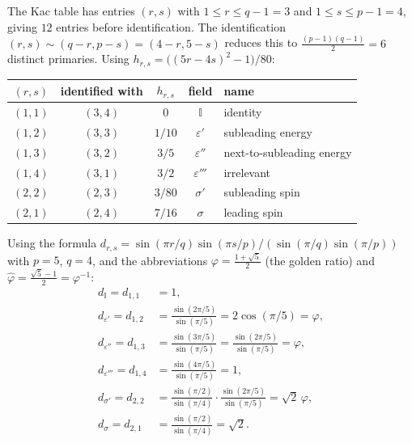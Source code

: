 \begin{computation}\label{comp:m54-primaries}
The Kac table has entries $(r,s)$ with $1 \leq r \leq q{-}1 = 3$ and
$1 \leq s \leq p{-}1 = 4$, giving $12$ entries before identification.
The identification $(r,s) \sim (q{-}r, p{-}s) = (4{-}r, 5{-}s)$ reduces this
to $\frac{(p-1)(q-1)}{2} = 6$ distinct primaries.
Using $h_{r,s} = \bigl((5r - 4s)^2 - 1\bigr)/80$:
\begin{center}
\renewcommand{\arraystretch}{1.2}
\begin{tabular}{ccccl}
\hline
$(r,s)$ & identified with & $h_{r,s}$ & field & name \\
\hline
$(1,1)$ & $(3,4)$ & $0$ & $\mathbb{I}$ & identity \\
$(1,2)$ & $(3,3)$ & $1/10$ & $\varepsilon'$ & subleading energy \\
$(1,3)$ & $(3,2)$ & $3/5$ & $\varepsilon''$ & next-to-subleading energy \\
$(1,4)$ & $(3,1)$ & $3/2$ & $\varepsilon'''$ & irrelevant \\
$(2,2)$ & $(2,3)$ & $3/80$ & $\sigma'$ & subleading spin \\
$(2,1)$ & $(2,4)$ & $7/16$ & $\sigma$ & leading spin \\
\hline
\end{tabular}
\end{center}
\end{computation}

\begin{proposition}\label{prop:quantum-dim-5-4}
Using the formula $d_{r,s} = \sin(\pi r/q)\sin(\pi s/p)/(\sin(\pi/q)\sin(\pi/p))$
with $p=5$, $q=4$, and the abbreviations $\varphi = \frac{1+\sqrt{5}}{2}$ (the
golden ratio) and $\hat\varphi = \frac{\sqrt{5}-1}{2} = \varphi^{-1}$:
\begin{align}
d_{\mathbb{I}} = d_{1,1} &= 1, \\
d_{\varepsilon'} = d_{1,2} &= \frac{\sin(2\pi/5)}{\sin(\pi/5)} = 2\cos(\pi/5) = \varphi, \label{eq:d12-golden}\\
d_{\varepsilon''} = d_{1,3} &= \frac{\sin(3\pi/5)}{\sin(\pi/5)} = \frac{\sin(2\pi/5)}{\sin(\pi/5)} = \varphi, \\
d_{\varepsilon'''} = d_{1,4} &= \frac{\sin(4\pi/5)}{\sin(\pi/5)} = 1, \\
d_{\sigma'} = d_{2,2} &= \frac{\sin(\pi/2)}{\sin(\pi/4)}\cdot\frac{\sin(2\pi/5)}{\sin(\pi/5)} = \sqrt{2}\,\varphi, \\
d_{\sigma} = d_{2,1} &= \frac{\sin(\pi/2)}{\sin(\pi/4)} = \sqrt{2}.
\end{align}
\end{proposition}

